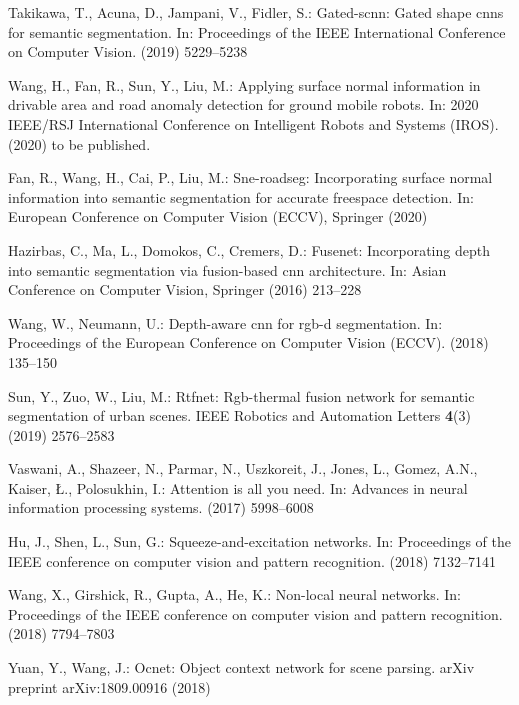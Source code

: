 \documentclass[runningheads]{llncs}
\begin{document}
\begin{thebibliography}{10}
	Takikawa, T., Acuna, D., Jampani, V., Fidler, S.:
	\newblock Gated-scnn: Gated shape cnns for semantic segmentation.
	\newblock In: Proceedings of the IEEE International Conference on Computer
	Vision. (2019)  5229--5238
	
	Wang, H., Fan, R., Sun, Y., Liu, M.:
	\newblock Applying surface normal information in drivable area and road anomaly
	detection for ground mobile robots.
	\newblock In: 2020 IEEE/RSJ International Conference on Intelligent Robots and
	Systems (IROS). (2020) to be published.
	
	Fan, R., Wang, H., Cai, P., Liu, M.:
	\newblock Sne-roadseg: Incorporating surface normal information into semantic
	segmentation for accurate freespace detection.
	\newblock In: European Conference on Computer Vision (ECCV), Springer (2020)
	
	Hazirbas, C., Ma, L., Domokos, C., Cremers, D.:
	\newblock Fusenet: Incorporating depth into semantic segmentation via
	fusion-based cnn architecture.
	\newblock In: Asian Conference on Computer Vision, Springer (2016)  213--228
	
	Wang, W., Neumann, U.:
	\newblock Depth-aware cnn for rgb-d segmentation.
	\newblock In: Proceedings of the European Conference on Computer Vision (ECCV).
	(2018)  135--150
	
	Sun, Y., Zuo, W., Liu, M.:
	\newblock Rtfnet: Rgb-thermal fusion network for semantic segmentation of urban
	scenes.
	\newblock IEEE Robotics and Automation Letters \textbf{4}(3) (2019)  2576--2583
	
	Vaswani, A., Shazeer, N., Parmar, N., Uszkoreit, J., Jones, L., Gomez, A.N.,
	Kaiser, {\L}., Polosukhin, I.:
	\newblock Attention is all you need.
	\newblock In: Advances in neural information processing systems. (2017)
	5998--6008
	
	Hu, J., Shen, L., Sun, G.:
	\newblock Squeeze-and-excitation networks.
	\newblock In: Proceedings of the IEEE conference on computer vision and pattern
	recognition. (2018)  7132--7141
	
	Wang, X., Girshick, R., Gupta, A., He, K.:
	\newblock Non-local neural networks.
	\newblock In: Proceedings of the IEEE conference on computer vision and pattern
	recognition. (2018)  7794--7803
	
	Yuan, Y., Wang, J.:
	\newblock Ocnet: Object context network for scene parsing.
	\newblock arXiv preprint arXiv:1809.00916 (2018)
	

\end{thebibliography}
\end{document}
